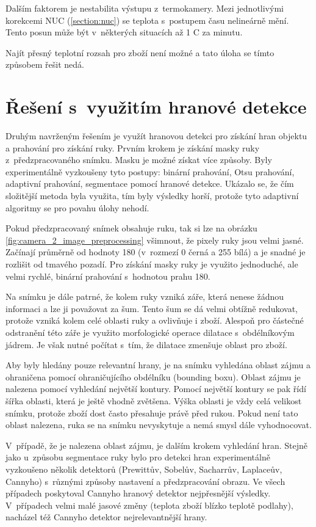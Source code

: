 Dalším faktorem je nestabilita výstupu z~termokamery. Mezi jednotlivými korekcemi NUC (\ref{section:nuc}) se teplota s~postupem času nelineárně mění. Tento posun může být v~některých situacích až 1 \textdegree{}C za minutu. 

Najít přesný teplotní rozsah pro zboží není možné a tato úloha se tímto způsobem řešit nedá.

\clearpage

\section{Řešení s~využitím hranové detekce}\label{section:edge_detection_solution}
Druhým navrženým řešením je využít hranovou detekci pro získání hran objektu a prahování pro získání ruky. Prvním krokem je získání masky ruky z~předzpracovaného snímku. Masku je možné získat více způsoby. Byly experimentálně vyzkoušeny tyto postupy: binární prahování, Otsu prahování, adaptivní prahování, segmentace pomocí hranové detekce. Ukázalo se, že čím složitější metoda byla využita, tím byly výsledky horší, protože tyto adaptivní algoritmy se pro povahu úlohy nehodí. 

Pokud předzpracovaný snímek obsahuje ruku, tak si lze na obrázku \ref{fig:camera_2_image_preprocessing} všimnout, že pixely ruky jsou velmi jasné. Začínají průměrně od hodnoty 180 (v~rozmezí 0 černá a 255 bílá) a je snadné je rozlišit od tmavého pozadí. Pro získání masky ruky je  využito jednoduché, ale velmi rychlé, binární prahování s~hodnotou prahu 180.

Na snímku je dále patrné, že kolem ruky vzniká záře, která nenese žádnou informaci a lze ji považovat za šum. Tento šum se dá velmi obtížně redukovat, protože vzniká kolem celé oblasti ruky a ovlivňuje i zboží. Alespoň pro částečné odstranění této záře je využito morfologické operace dilatace \cite{serra1982image} s~obdélníkovým jádrem. Je však nutné počítat s~tím, že dilatace zmenšuje oblast pro zboží.

Aby byly hledány pouze relevantní hrany, je na snímku vyhledána oblast zájmu a ohraničena pomocí ohraničujícího obdélníku (bounding boxu). Oblast zájmu je nalezena pomocí vyhledání největší kontury. Pomocí největší kontury se pak řídí šířka oblasti, která je ještě vhodně zvětšena. Výška oblasti je vždy celá velikost snímku, protože zboží dost často přesahuje právě před rukou. Pokud není tato oblast nalezena, ruka se na snímku nevyskytuje a nemá smysl dále vyhodnocovat.

V~případě, že je nalezena oblast zájmu, je dalším krokem vyhledání hran. Stejně jako u~způsobu segmentace ruky bylo pro detekci hran experimentálně vyzkoušeno několik detektorů (Prewittův, Sobelův, Sacharrův, Laplaceův, Cannyho) s~různými způsoby nastavení a předzpracování obrazu. Ve všech případech poskytoval Cannyho hranový detektor \cite{canny1986computational} nejpřesnější výsledky. V~případech velmi malé jasové změny (teplota zboží blízko teplotě podlahy), nacházel též Cannyho detektor nejrelevantnější hrany.

